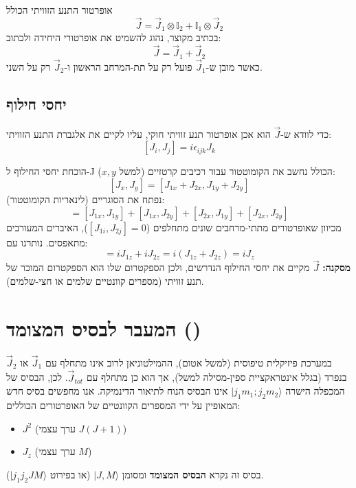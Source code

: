 \begin{definitionbox}{אופרטור התנע הזוויתי הכולל}
\begin{equation}
\vec{J} = \vec{J}_1 \otimes \mathbb{I}_2 + \mathbb{I}_1 \otimes \vec{J}_2
\end{equation}
בכתיב מקוצר, נהוג להשמיט את אופרטורי היחידה ולכתוב:
\begin{equation}
\vec{J} = \vec{J}_1 + \vec{J}_2
\end{equation}
כאשר מובן ש-$\vec{J}_1$ פועל רק על תת-המרחב הראשון ו-$\vec{J}_2$ רק על השני.
\end{definitionbox}

\subsection{יחסי חילוף}
כדי לוודא ש-$\vec{J}$ הוא אכן אופרטור תנע זוויתי חוקי, עליו לקיים את אלגברת התנע הזוויתי:
\[
[J_i, J_j] = i \epsilon_{ijk} J_k
\]
\begin{theorembox}{הוכחת יחסי החילוף ל-J הכולל}
נחשב את הקומוטטור עבור רכיבים קרטזיים (למשל $x, y$):
\[
[J_x, J_y] = [J_{1x} + J_{2x}, J_{1y} + J_{2y}]
\]
נפתח את הסוגריים (לינאריות הקומוטטור):
\[
= [J_{1x}, J_{1y}] + [J_{1x}, J_{2y}] + [J_{2x}, J_{1y}] + [J_{2x}, J_{2y}]
\]
מכיוון שאופרטורים מתתי-מרחבים שונים מתחלפים ($[J_{1i}, J_{2j}] = 0$), האיברים המעורבים מתאפסים. נותרנו עם:
\[
= i J_{1z} + i J_{2z} = i(J_{1z} + J_{2z}) = i J_z
\]
\textbf{מסקנה:} $\vec{J}$ מקיים את יחסי החילוף הנדרשים, ולכן הספקטרום שלו הוא הספקטרום המוכר של תנע זוויתי (מספרים קוונטיים שלמים או חצי-שלמים).
\end{theorembox}

\section{המעבר לבסיס המצומד ()}

במערכת פיזיקלית טיפוסית (למשל אטום), ההמילטוניאן לרוב אינו מתחלף עם $\vec{J}_1$ או $\vec{J}_2$ בנפרד (בגלל אינטראקציית ספין-מסילה למשל), אך הוא כן מתחלף עם $\vec{J}_{tot}$.
לכן, הבסיס של המכפלה הישרה $|j_1 m_1; j_2 m_2\rangle$ אינו הבסיס הנוח לתיאור הדינמיקה. אנו מחפשים בסיס חדש המאופיין על ידי המספרים הקוונטיים של האופרטורים הכוללים:
\begin{itemize}
    \item $J^2$ (ערך עצמי $J(J+1)$)
    \item $J_z$ (ערך עצמי $M$)
\end{itemize}
בסיס זה נקרא \textbf{הבסיס המצומד} ומסומן $|J, M\rangle$ (או בפירוט $|j_1 j_2 J M\rangle$).

